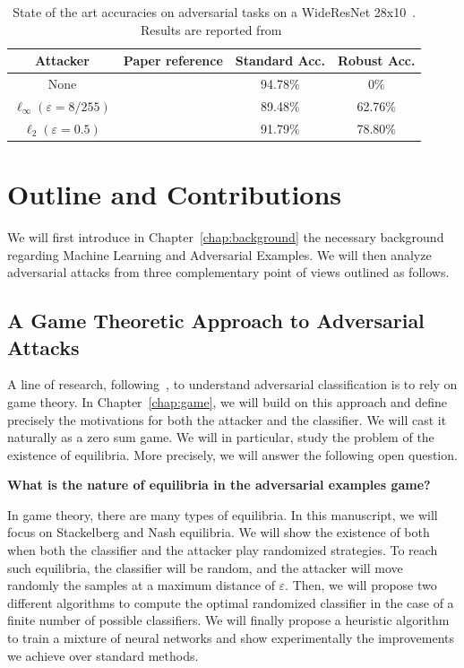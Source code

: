\begin{table}[ht]
    \centering
    \begin{tabular}{c|c|c|c}
       \textbf{Attacker}  &  \textbf{Paper reference} & \textbf{Standard Acc.} & \textbf{Robust Acc.}  \\ \hline
        None & \citep{ZagoruykoK16} & 94.78\% & 0\%\\
        $\ell_\infty (\varepsilon=8/255)$&  \citep{rebuffi2021fixing}& 89.48\% & 62.76\%\\
        $\ell_2 (\varepsilon=0.5)$&  \citep{rebuffi2021fixing}& 91.79\% & 78.80\%\\
    \end{tabular}
    \caption{State of the art accuracies on adversarial tasks on a WideResNet 28x10~\citep{ZagoruykoK16}. Results are reported from~\citep{croce2020robustbench}}
\label{table:sota-cifar}
\end{table}

\section{Outline and Contributions}
We will first introduce in Chapter~\ref{chap:background} the necessary  background regarding Machine Learning and Adversarial Examples. We will then analyze  adversarial attacks from three complementary point of views outlined as follows.
\subsection{A Game Theoretic Approach to Adversarial Attacks}

A line of research, following~\cite{pinot2020randomization}, to understand adversarial classification is to rely on game theory. In Chapter~\ref{chap:game},  we will build on this approach and define precisely the motivations for both the attacker and the classifier. We will cast it naturally as a zero sum game. We will in particular, study the problem  of the existence of equilibria. More precisely, we will answer the following open question.
\medskip
\begin{tcolorbox}[title=Question 1]
\textbf{What is the nature of equilibria in the adversarial examples game?}
\end{tcolorbox}
\medskip

In game theory, there are many types of equilibria. In this manuscript, we will focus on Stackelberg and Nash equilibria. We will show the existence of both when both the classifier and the attacker play randomized strategies. To reach such equilibria, the classifier will be random, and the attacker will move randomly the samples at a maximum distance of $\varepsilon$. Then, we will propose two different algorithms to compute the optimal randomized classifier in the case of a finite number of possible classifiers. We will finally propose a heuristic algorithm to train a mixture of neural networks and show experimentally the improvements we achieve over standard methods.

